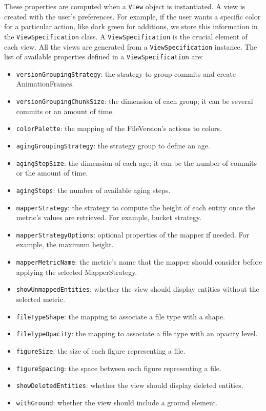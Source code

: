 These properties are computed when a \texttt{View} object is instantiated. A view is created with the user's preferences. 
For example, if the user wants a specific color for a particular action, like dark green for additions, we store this information in the \texttt{ViewSpecification} class. A \texttt{ViewSpecification} is the crucial element of each view. 
All the views are generated from a \texttt{ViewSpecification} instance. The list of available properties defined in a \texttt{ViewSpecification} are:
\begin{itemize}
    \item \texttt{versionGroupingStrategy}: the strategy to group commits and create AnimationFrames.
    \item \texttt{versionGroupingChunkSize}: the dimension of each group; it can be several commits or an amount of time. 
    \item \texttt{colorPalette}: the mapping of the FileVersion's actions to colors. 
    \item \texttt{agingGroupingStrategy}: the strategy group to define an age.
    \item \texttt{agingStepSize}: the dimension of each age; it can be the number of commits or the amount of time. 
    \item \texttt{agingSteps}: the number of available aging steps. 
    \item \texttt{mapperStrategy}: the strategy to compute the height of each entity once the metric's values are retrieved. For example, bucket strategy. 
    \item \texttt{mapperStrategyOptions}: optional properties of the mapper if needed. For example, the maximum height. 
    \item \texttt{mapperMetricName}: the metric's name that the mapper should consider before applying the selected MapperStrategy. 
    \item \texttt{showUnmappedEntities}: whether the view should display entities without the selected metric.
    \item \texttt{fileTypeShape}: the mapping to associate a file type with a shape.
    \item \texttt{fileTypeOpacity}: the mapping to associate a file type with an opacity level.
    \item \texttt{figureSize}: the size of each figure representing a file.
    \item \texttt{figureSpacing}: the space between each figure representing a file.
    \item \texttt{showDeletedEntities}: whether the view should display deleted entities.
    \item \texttt{withGround}: whether the view should include a ground element.
\end{itemize}

